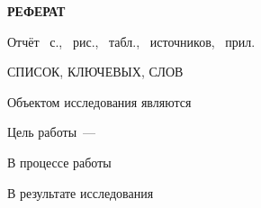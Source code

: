 \begin{center}
  \Large{\textbf{РЕФЕРАТ}}
\end{center}

Отчёт ~с., ~рис.,
~табл., ~источников,
~прил.

СПИСОК, КЛЮЧЕВЫХ, СЛОВ

Объектом исследования являются

Цель работы~--- 

В процессе работы

В результате исследования
\newpage
